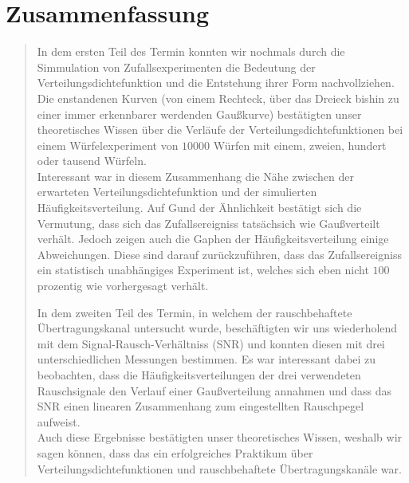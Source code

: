 \section{Zusammenfassung}
\begin{quote}
	In dem ersten Teil des Termin konnten wir nochmals durch die Simmulation von
	Zufallsexperimenten die Bedeutung der Verteilungsdichtefunktion
	und die Entstehung ihrer Form nachvollziehen. Die enstandenen Kurven (von einem
	Rechteck, über das Dreieck bishin zu einer immer erkennbarer werdenden
	Gaußkurve) bestätigten unser theoretisches Wissen über die Verläufe der
	Verteilungsdichtefunktionen bei einem Würfelexperiment von $10000$ Würfen mit einem, 
	zweien, hundert oder tausend Würfeln.\\
	Interessant war in diesem Zusammenhang die Nähe zwischen der erwarteten Verteilungsdichtefunktion und der simulierten
	Häufigkeitsverteilung. Auf Gund der Ähnlichkeit bestätigt sich die Vermutung, dass sich das Zufallsereigniss
	tatsächsich wie Gaußverteilt verhält. Jedoch zeigen auch die Gaphen der Häufigkeitsverteilung einige Abweichungen.
	Diese sind darauf zurückzuführen, dass das Zufallsereigniss ein statistisch unabhängiges Experiment ist, welches sich
	eben nicht $100$ prozentig wie vorhergesagt verhält.
	
	\vspace{1em}
	
	In dem zweiten Teil des Termin, in welchem der rauschbehaftete
	Übertragungskanal untersucht wurde, beschäftigten wir uns wiederholend mit dem 
	Signal-Rausch-Verhältniss (SNR) und konnten diesen mit drei unterschiedlichen
	Messungen bestimmen. Es war interessant dabei zu beobachten, dass die Häufigkeitsverteilungen der drei
	verwendeten Rauschsignale den Verlauf einer Gaußverteilung annahmen und dass
	das SNR einen linearen Zusammenhang zum eingestellten Rauschpegel aufweist.\\
	Auch diese Ergebnisse bestätigten unser theoretisches Wissen, weshalb wir sagen
	können, dass das ein erfolgreiches Praktikum über Verteilungsdichtefunktionen
	und rauschbehaftete Übertragungskanäle war.
	
\end{quote}


